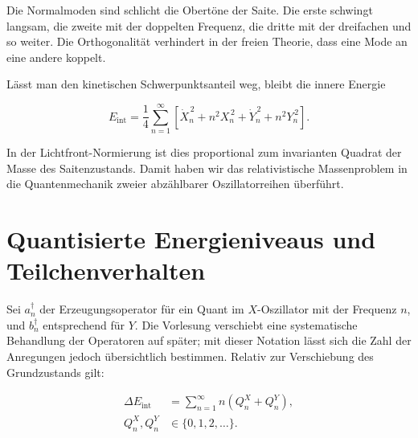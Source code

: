 Die Normalmoden sind schlicht die Obertöne der Saite. Die erste schwingt langsam, die zweite mit der doppelten Frequenz, die dritte mit der dreifachen und so weiter. Die Orthogonalität verhindert in der freien Theorie, dass eine Mode an eine andere koppelt.

\begin{classroomqa}
\end{classroomqa}

Lässt man den kinetischen Schwerpunktsanteil weg, bleibt die innere Energie

\begin{equation}
  E_{\mathrm{int}}
  =
  \frac14
  \sum_{n=1}^{\infty}
  \left[
    \dot X_n^{\,2}+n^2X_n^{\,2}
    +\dot Y_n^{\,2}+n^2Y_n^{\,2}
  \right].
  \label{eq:l02-internal-energy}
\end{equation}

In der Lichtfront-Normierung ist dies proportional zum invarianten Quadrat der Masse des Saitenzustands. Damit haben wir das relativistische Massenproblem in die Quantenmechanik zweier abzählbarer Oszillatorreihen überführt.

\section{Quantisierte Energieniveaus und Teilchenverhalten}

Sei \(a_n^\dagger\) der Erzeugungsoperator für ein Quant im \(X\)-Oszillator mit der Frequenz \(n\), und \(b_n^\dagger\) entsprechend für \(Y\). Die Vorlesung verschiebt eine systematische Behandlung der Operatoren auf später; mit dieser Notation lässt sich die Zahl der Anregungen jedoch übersichtlich bestimmen. Relativ zur Verschiebung des Grundzustands gilt:

\begin{equation}
  \begin{aligned}
    \Delta E_{\mathrm{int}}
    &=\sum_{n=1}^{\infty}n\left(Q_n^X+Q_n^Y\right),\\
    Q_n^X,Q_n^Y&\in\{0,1,2,\ldots\}.
  \end{aligned}
  \label{eq:l02-quantized-energy}
\end{equation}

